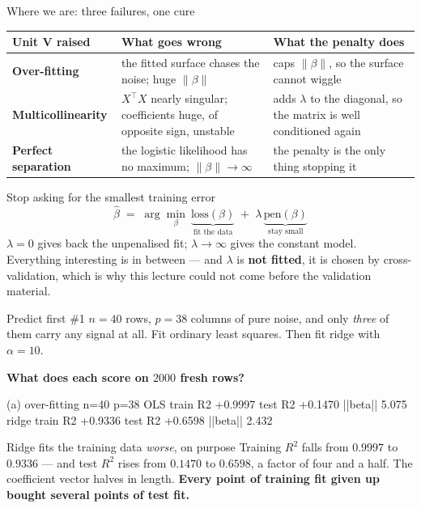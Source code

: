 \documentclass[aspectratio=169]{beamer}
\begin{document}
\begin{frame}[shrink=8]{Where we are: three failures, one cure}
  \begin{center}\small
  \begin{tabular}{@{}lp{4.4cm}p{4.6cm}@{}}
    \toprule
    \textbf{Unit V raised} & \textbf{What goes wrong} & \textbf{What the
      penalty does}\\
    \midrule
    \textbf{Over-fitting} & the fitted surface chases the noise; huge
      $\|\beta\|$ & caps $\|\beta\|$, so the surface cannot wiggle\\[4pt]
    \textbf{Multicollinearity} & $X^{\!\top}\!X$ nearly singular; coefficients
      huge, of opposite sign, unstable & adds $\lambda$ to the diagonal, so
      the matrix is well conditioned again\\[4pt]
    \textbf{Perfect separation} & the logistic likelihood has no maximum;
      $\|\beta\| \to \infty$ & the penalty is the only thing stopping it\\
    \bottomrule
  \end{tabular}
  \end{center}
  \vspace{0.2em}
  \begin{block}{Stop asking for the smallest training error}
    \[
      \hat\beta \;=\; \arg\min_\beta\ \underbrace{\text{loss}(\beta)}_{\text{fit
      the data}} \;+\; \lambda\,\underbrace{\text{pen}(\beta)}_{\text{stay
      small}}
    \]
    \small $\lambda = 0$ gives back the unpenalised fit; $\lambda \to \infty$
    gives the constant model. Everything interesting is in between --- and
    $\lambda$ is \textbf{not fitted}, it is chosen by cross-validation, which
    is why this lecture could not come before the validation material.
  \end{block}
\end{frame}

\begin{frame}[fragile,shrink=8]{Predict first \#1}
$n = 40$ rows, $p = 38$ columns of pure noise, and only \emph{three} of them
carry any signal at all. Fit ordinary least squares. Then fit ridge with
$\alpha = 10$.

\begin{center}
  \textbf{What does each score on $2000$ fresh rows?}
\end{center}
\vspace{0.2em}
\begin{outblk}
(a) over-fitting     n=40  p=38
    OLS   train R2 +0.9997   test R2 +0.1470   ||beta||    5.075
    ridge train R2 +0.9336   test R2 +0.6598   ||beta||    2.432
\end{outblk}
\begin{alertblock}{Ridge fits the training data \emph{worse}, on purpose}
  \footnotesize Training $R^2$ falls from $0.9997$ to $0.9336$ --- and test
  $R^2$ rises from $0.1470$ to $\mathbf{0.6598}$, a factor of four and a half.
  The coefficient vector halves in length. \textbf{Every point of training fit
  given up bought several points of test fit.}
\end{alertblock}
\end{frame}
\end{document}
